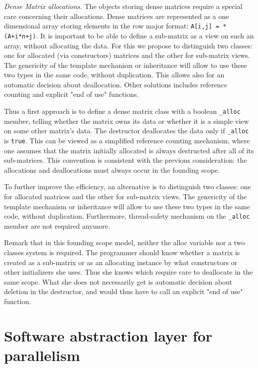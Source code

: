 \documentclass{article}
\begin{document}
\begin{paragraph}
{\em Dense Matrix allocations.}
The objects storing dense matrices require a special care
concerning their allocations. Dense matrices are represented as a one
dimensional array storing elements in the row major format:
\texttt{A[i,j] = *(A+i*n+j)}.  It is important to be 
able to define a sub-matrix as a view on such an array, without
allocating the data.
For this we propose to distinguish two classes: one for allocated (via
constructors) matrices and the other for sub-matrix views. The 
genericity of  the template mechanism or inheritance will allow to use
these two types in the same code, without duplication. This allows
also for an automatic decision about deallocation.
Other solutions includes reference counting and explicit "end of use"
functions.

 Thus a first approach is to define a dense matrix class with a
 boolean \texttt{\_alloc} 
 member, telling whether the matrix owns its data or whether it is a
 simple view 
 on some other matrix's data. The destructor deallocates the data only if
 \texttt{\_alloc} is \texttt{true}. This can be viewed as a simplified
 reference counting mechanism, where one assumes that the matrix
 initially allocated is always destructed after all of its
 sub-matrices. This convention is consistent with the previous
 consideration: the allocations and deallocations must always occur in
 the founding scope.

 To further improve the efficiency, an alternative is to distinguish
 two classes: 
 one for allocated matrices and the other for sub-matrix views. The
 genericity of 
  the template mechanism or inheritance will allow to use these two
  types in the same code, without duplication. Furthermore,
  thread-safety mechanism on the \texttt{\_alloc} 
 member are not required anymore.

Remark that in this founding scope model, neither the alloc variable nor a two
classes system is required.
The programmer should know whether a matrix is created as a sub-matrix
or as an allocating instance by what constructors or other initializers
she uses. Thus she knows which require care to deallocate in the same scope.
What she does not necessarily get is automatic decision about deletion
in the destructor, and would thus have to call an explicit "end of use"
function.
\end{paragraph}


\section{Software abstraction layer for parallelism}
\end{document}
